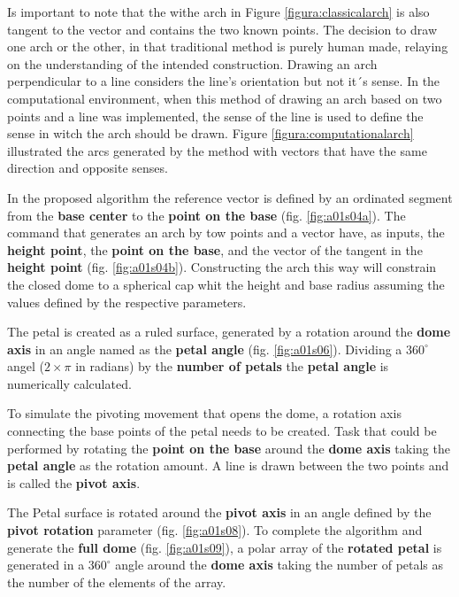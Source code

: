 \documentclass[preprint,12pt,3p]{elsarticle}
\begin{document}
Is important to note that the withe arch in Figure \ref{figura:classicalarch} is also tangent to the vector and contains the two known points. The decision to draw one arch or the other, in that traditional method is purely human made, relaying on the understanding of the intended construction. Drawing an arch perpendicular to a line considers the line's orientation but not it´s sense. In the computational environment, when this method of drawing an arch based on two points and a line was implemented, the sense of the line is used to define the sense in witch the arch should be drawn. Figure \ref{figura:computationalarch} illustrated the arcs generated by the method with vectors that have the same direction and opposite senses.

In the proposed algorithm the reference vector is defined by an ordinated segment from the \textbf{base center} to the \textbf{point on the base} (fig. \ref{fig:a01s04a}). The command that generates an arch by tow points and a vector have, as inputs, the \textbf{height point}, the \textbf{point on the base}, and the vector of the tangent in the \textbf{height point}  (fig. \ref{fig:a01s04b}). Constructing the arch this way will constrain the closed dome to a spherical cap whit the height and base radius assuming the values defined by the respective parameters.

The petal is created as a ruled surface, generated by a rotation around the \textbf{dome axis} in an angle named as the \textbf{petal angle} (fig. \ref{fig:a01s06}). Dividing a $360 ^{\circ}$ angel ($2\times \pi $ in radians) by the \textbf{number of petals} the \textbf{petal angle} is numerically calculated. 

To simulate the pivoting movement that opens the dome, a rotation axis connecting the base points of the petal needs to be created. Task that could be performed  by rotating the \textbf{point on the base} around the \textbf{dome axis} taking the \textbf{petal angle} as the rotation amount. A line is drawn between the two points and is called the \textbf{pivot axis}.

The Petal surface is rotated around the \textbf{pivot axis} in an angle defined by the \textbf{pivot rotation} parameter (fig. \ref{fig:a01s08}). To complete the algorithm and generate the \textbf{full dome} (fig. \ref{fig:a01s09}), a polar array of the \textbf{rotated petal} is generated in a $360 ^{\circ}$ angle around the \textbf{dome axis} taking the number of petals as the number of the elements of the array.
\end{document}
